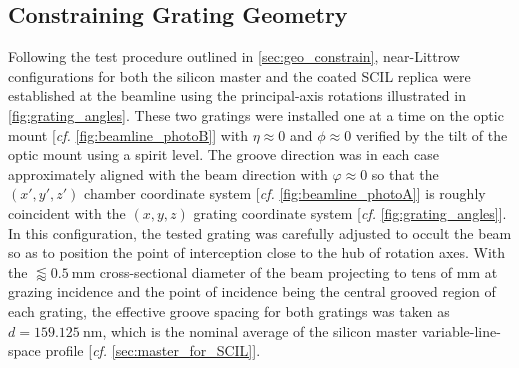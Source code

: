\subsection{Constraining Grating Geometry}\label{sec:grat_geo_scil}
Following the test procedure outlined in \cref{sec:geo_constrain}, near-Littrow configurations for both the silicon master and the coated SCIL replica were established at the beamline using the principal-axis rotations illustrated in \cref{fig:grating_angles}. 
These two gratings were installed one at a time on the optic mount [\emph{cf.\@} \cref{fig:beamline_photoB}] with $\eta \approx 0$ and $\phi \approx 0$ verified by the tilt of the optic mount using a spirit level. 
The groove direction was in each case approximately aligned with the beam direction with $\varphi \approx 0$ so that the $(x',y',z')$ chamber coordinate system [\emph{cf.\@} \cref{fig:beamline_photoA}] is roughly coincident with the $(x,y,z)$ grating coordinate system [\emph{cf.\@} \cref{fig:grating_angles}]. 
In this configuration, the tested grating was carefully adjusted to occult the beam so as to position the point of interception close to the hub of rotation axes. 
With the $\lessapprox \SI{0.5}{\mm}$ cross-sectional diameter of the beam projecting to tens of \si{\mm} at grazing incidence and the point of incidence being the central grooved region of each grating, the effective groove spacing for both gratings was taken as $d = \SI{159.125}{\nm}$, which is the nominal average of the silicon master variable-line-space profile [\emph{cf.\@} \cref{sec:master_for_SCIL}]. 

